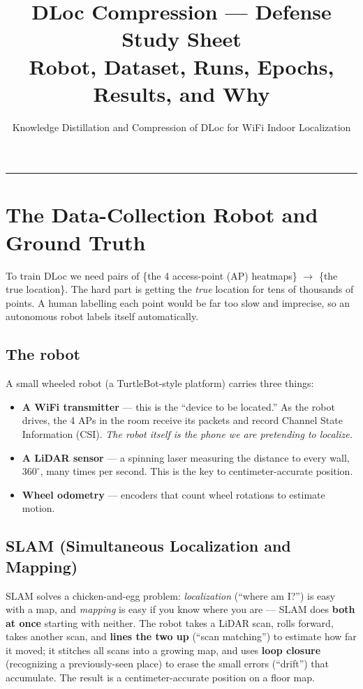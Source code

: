 \documentclass[11pt]{article}
\title{\textbf{DLoc Compression --- Defense Study Sheet}\\[2mm]
\large Robot, Dataset, Runs, Epochs, Results, and Why}
\author{Knowledge Distillation and Compression of DLoc for WiFi Indoor Localization}
\date{}
\begin{document}
\maketitle
\tableofcontents
\vspace{4mm}
\hrule
\vspace{4mm}

\section{The Data-Collection Robot and Ground Truth}

To train DLoc we need pairs of \{the 4 access-point (AP) heatmaps\} $\rightarrow$ \{the true
location\}. The hard part is getting the \emph{true} location for tens of thousands of points.
A human labelling each point would be far too slow and imprecise, so an autonomous robot
labels itself automatically.

\subsection*{The robot}
A small wheeled robot (a TurtleBot-style platform) carries three things:
\begin{itemize}[noitemsep]
  \item \textbf{A WiFi transmitter} --- this is the ``device to be located.'' As the robot drives,
        the 4 APs in the room receive its packets and record Channel State Information (CSI).
        \emph{The robot itself is the phone we are pretending to localize.}
  \item \textbf{A LiDAR sensor} --- a spinning laser measuring the distance to every wall,
        $360^\circ$, many times per second. This is the key to centimeter-accurate position.
  \item \textbf{Wheel odometry} --- encoders that count wheel rotations to estimate motion.
\end{itemize}

\subsection*{SLAM (Simultaneous Localization and Mapping)}
SLAM solves a chicken-and-egg problem: \emph{localization} (``where am I?'') is easy with a map,
and \emph{mapping} is easy if you know where you are --- SLAM does \textbf{both at once} starting
with neither. The robot takes a LiDAR scan, rolls forward, takes another scan, and
\textbf{lines the two up} (``scan matching'') to estimate how far it moved; it stitches all scans
into a growing map, and uses \textbf{loop closure} (recognizing a previously-seen place) to erase
the small errors (``drift'') that accumulate. The result is a centimeter-accurate position on a
floor map.
\end{document}
